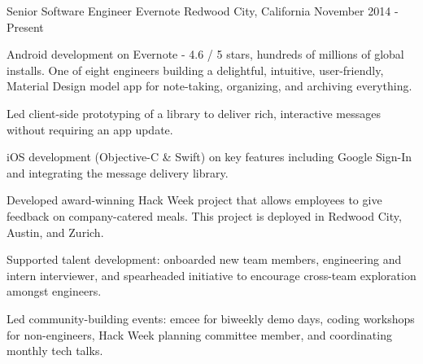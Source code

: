 

\begin{cventries}

  \cventry
    {Senior Software Engineer} %
    {Evernote} %
    {Redwood City, California} %
    {November 2014 - Present} %
    {
	\begin{cvitems} %
      	\item {Android development on Evernote - 4.6 / 5 stars, hundreds of millions of global installs. One of eight engineers building a delightful, intuitive, user-friendly, Material Design model app for note-taking, organizing, and archiving everything.}        
	\item {Led client-side prototyping of a library to deliver rich, interactive messages without requiring an app update.}
	\item {iOS development (Objective-C \& Swift) on key features including Google Sign-In and integrating the message delivery library.}
	\item {Developed award-winning Hack Week project that allows employees to give feedback on company-catered meals. This project is  deployed in Redwood City, Austin, and Zurich.}
	\item {Supported talent development: onboarded new team members, engineering and intern interviewer, and spearheaded initiative to encourage cross-team exploration amongst engineers.}
	\item {Led community-building events: emcee for biweekly demo days, coding workshops for non-engineers, Hack Week planning committee member, and coordinating monthly tech talks.}
	\end{cvitems}
    }
    

\end{cventries}

